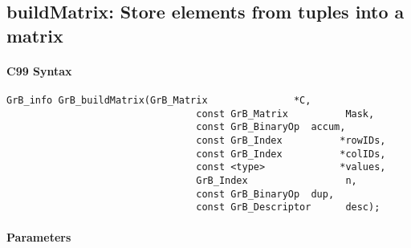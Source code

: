 \subsection{{\sf buildMatrix}: Store elements from tuples into a matrix}
\label{Sec:buildMatrix}

\paragraph{C99 Syntax}

\begin{Verbatim}[samepage=true]    
        GrB_info GrB_buildMatrix(GrB_Matrix               *C,
                                 const GrB_Matrix          Mask,
                                 const GrB_BinaryOp  accum,
                                 const GrB_Index          *rowIDs,
                                 const GrB_Index          *colIDs, 
                                 const <type>             *values,
                                 GrB_Index                 n,
                                 const GrB_BinaryOp  dup,
                                 const GrB_Descriptor      desc);
\end{Verbatim}

\paragraph{Parameters}

